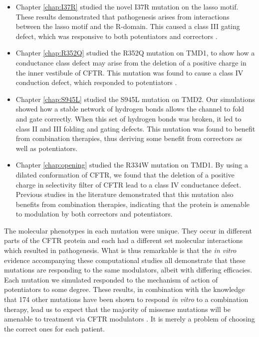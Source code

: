 
\begin{itemize}
	\item Chapter \ref{chap:I37R} studied the novel I37R mutation on the lasso motif. These results demonstrated that pathogenesis arises from interactions between the lasso motif and the R-domain. This caused a class III gating defect, which was responsive to both potentiators and correctors \cite{wong2022}. 
	\item Chapter \ref{chap:R352Q} studied the R352Q mutation on TMD1, to show how a conductance class defect may arise from the deletion of a positive charge in the inner vestibule of CFTR. This mutation was found to cause a class IV conduction defect, which responded to potentiators \cite{wong2022a}.
\item Chapter \ref{chap:S945L} studied the S945L mutation on TMD2. Our simulations showed how a stable network of hydrogen bonds allows the channel to fold and gate correctly. When this set of hydrogen bonds was broken, it led to class II and III folding and gating defects. This mutation was found to benefit from combination therapies, thus deriving some benefit from correctors as well as potentiators.  
\item Chapter \ref{chap:opening} studied the R334W mutation on TMD1. By using a dilated conformation of CFTR, we found that the deletion of a positive charge in selectivity filter of CFTR lead to a class IV conductance defect. Previous studies in the literature demonstrated that this mutation also benefits from combination therapies, indicating that the protein is amenable to modulation by both correctors and potentiators. 
\end{itemize}

The molecular phenotypes in each mutation were unique. They occur in different parts of the CFTR protein and each had a different set molecular interactions which resulted in pathogenesis. What is thus remarkable is that the \textit{in vitro} evidence accompanying these computational studies all demonstrate that these mutations are responding to the same modulators, albeit with differing efficacies. Each mutation we simulated responded to the mechanism of action of potentiators to some degree. These results, in combination with the knowledge that 174 other mutations have been shown to respond \textit{in vitro} to a combination therapy, lead us to expect that the majority of missense mutations will be amenable to treatment via CFTR modulators \cite{trikafta_FDA_info}. It is merely a problem of choosing the correct ones for each patient.


